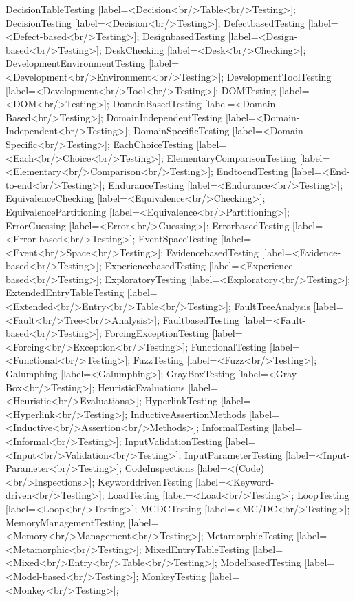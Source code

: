 \documentclass{article}
\begin{document}
{DecisionTableTesting [label=<Decision<br/>Table<br/>Testing>];
DecisionTesting [label=<Decision<br/>Testing>];
DefectbasedTesting [label=<Defect-based<br/>Testing>];
DesignbasedTesting [label=<Design-based<br/>Testing>];
DeskChecking [label=<Desk<br/>Checking>];
DevelopmentEnvironmentTesting [label=<Development<br/>Environment<br/>Testing>];
DevelopmentToolTesting [label=<Development<br/>Tool<br/>Testing>];
DOMTesting [label=<DOM<br/>Testing>];
DomainBasedTesting [label=<Domain-Based<br/>Testing>];
DomainIndependentTesting [label=<Domain-Independent<br/>Testing>];
DomainSpecificTesting [label=<Domain-Specific<br/>Testing>];
EachChoiceTesting [label=<Each<br/>Choice<br/>Testing>];
ElementaryComparisonTesting [label=<Elementary<br/>Comparison<br/>Testing>];
EndtoendTesting [label=<End-to-end<br/>Testing>];
EnduranceTesting [label=<Endurance<br/>Testing>];
EquivalenceChecking [label=<Equivalence<br/>Checking>];
EquivalencePartitioning [label=<Equivalence<br/>Partitioning>];
ErrorGuessing [label=<Error<br/>Guessing>];
ErrorbasedTesting [label=<Error-based<br/>Testing>];
EventSpaceTesting [label=<Event<br/>Space<br/>Testing>];
EvidencebasedTesting [label=<Evidence-based<br/>Testing>];
ExperiencebasedTesting [label=<Experience-based<br/>Testing>];
ExploratoryTesting [label=<Exploratory<br/>Testing>];
ExtendedEntryTableTesting [label=<Extended<br/>Entry<br/>Table<br/>Testing>];
FaultTreeAnalysis [label=<Fault<br/>Tree<br/>Analysis>];
FaultbasedTesting [label=<Fault-based<br/>Testing>];
ForcingExceptionTesting [label=<Forcing<br/>Exception<br/>Testing>];
FunctionalTesting [label=<Functional<br/>Testing>];
FuzzTesting [label=<Fuzz<br/>Testing>];
Galumphing [label=<Galumphing>];
GrayBoxTesting [label=<Gray-Box<br/>Testing>];
HeuristicEvaluations [label=<Heuristic<br/>Evaluations>];
HyperlinkTesting [label=<Hyperlink<br/>Testing>];
InductiveAssertionMethods [label=<Inductive<br/>Assertion<br/>Methods>];
InformalTesting [label=<Informal<br/>Testing>];
InputValidationTesting [label=<Input<br/>Validation<br/>Testing>];
InputParameterTesting [label=<Input-Parameter<br/>Testing>];
CodeInspections [label=<(Code)<br/>Inspections>];
KeyworddrivenTesting [label=<Keyword-driven<br/>Testing>];
LoadTesting [label=<Load<br/>Testing>];
LoopTesting [label=<Loop<br/>Testing>];
MCDCTesting [label=<MC/DC<br/>Testing>];
MemoryManagementTesting [label=<Memory<br/>Management<br/>Testing>];
MetamorphicTesting [label=<Metamorphic<br/>Testing>];
MixedEntryTableTesting [label=<Mixed<br/>Entry<br/>Table<br/>Testing>];
ModelbasedTesting [label=<Model-based<br/>Testing>];
MonkeyTesting [label=<Monkey<br/>Testing>];
}
\end{document}
